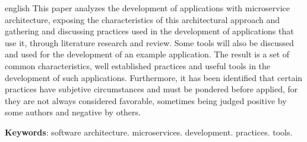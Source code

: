 \setlength{\absparsep}{18pt} %
\begin{resumo}[Abstract]
 \begin{otherlanguage*}{english}
   This paper analyzes the development of applications with microservice architecture, exposing the characteristics of this architectural approach and gathering and discussing practices used in the development of applications that use it, through literature research and review. Some tools will also be discussed and used for the development of an example application. The result is a set of common characteristics, well established practices and useful tools in the development of such applications. Furthermore, it has been identified that certain practices have subjetive circumstances and must be pondered before applied, for they are not always considered favorable, sometimes being judged positive by some authors and negative by others.
   

   \vspace{\onelineskip}
 
   \noindent 
   \textbf{Keywords}: software architecture. microservices. development. practices. tools.
 \end{otherlanguage*}
\end{resumo}
